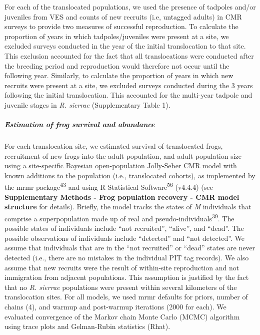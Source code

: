 \documentclass[
  letterpaper,
  DIV=11,
  numbers=noendperiod]{scrartcl}
\let\oldsubparagraph\subparagraph
\renewcommand{\subparagraph}[1]{\oldsubparagraph{#1}\mbox{}}
\begin{document}
For each of the translocated populations, we used the presence of
tadpoles and/or juveniles from VES and counts of new recruits (i.e,
untagged adults) in CMR surveys to provide two measures of successful
reproduction. To calculate the proportion of years in which
tadpoles/juveniles were present at a site, we excluded surveys conducted
in the year of the initial translocation to that site. This exclusion
accounted for the fact that all translocations were conducted after the
breeding period and reproduction would therefore not occur until the
following year. Similarly, to calculate the proportion of years in which
new recruits were present at a site, we excluded surveys conducted
during the 3 years following the initial translocation. This accounted
for the multi-year tadpole and juvenile stages in \emph{R. sierrae}
(Supplementary Table 1).

\subparagraph{Estimation of frog survival and
abundance}\label{estimation-of-frog-survival-and-abundance}

For each translocation site, we estimated survival of translocated
frogs, recruitment of new frogs into the adult population, and adult
population size using a site-specific Bayesian open-population
Jolly-Seber CMR model with known additions to the population (i.e.,
translocated cohorts), as implemented by the mrmr
package\textsuperscript{43} and using R Statistical
Software\textsuperscript{56} (v4.4.4) (see \textbf{Supplementary Methods
- Frog population recovery - CMR model structure} for details). Briefly,
the model tracks the states of \emph{M} individuals that comprise a
superpopulation made up of real and
pseudo-individuals\textsuperscript{39}. The possible states of
individuals include ``not recruited'', ``alive'', and ``dead''. The
possible observations of individuals include ``detected'' and ``not
detected''. We assume that individuals that are in the ``not recruited''
or ``dead'' states are never detected (i.e., there are no mistakes in
the individual PIT tag records). We also assume that new recruits were
the result of within-site reproduction and not immigration from adjacent
populations. This assumption is justified by the fact that no \emph{R.
sierrae} populations were present within several kilometers of the
translocation sites. For all models, we used mrmr defaults for priors,
number of chains (4), and warmup and post-warmup iterations (2000 for
each). We evaluated convergence of the Markov chain Monte Carlo (MCMC)
algorithm using trace plots and Gelman-Rubin statistics (Rhat).
\end{document}
